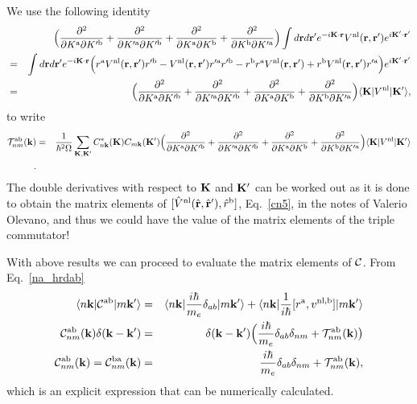 \documentclass[floatfix,prb,aps,superscriptaddress,11pt,preprint]{revtex4}
\begin{document}
We use the following identity
\begin{eqnarray}\label{3.4}
&&
\Big(
\frac{\partial^2}{\partial K^{\mathrm{a}}\partial K'^{\mathrm{b}}}
+
\frac{\partial^2}{\partial K'^{\mathrm{a}}\partial K'^{\mathrm{b}}}
+
\frac{\partial^2}{\partial K^{\mathrm{a}}\partial K^{\mathrm{b}}}
+
\frac{\partial^2}{\partial K^{\mathrm{b}}\partial K'^{\mathrm{a}}}
\Big)
\int
d\mathbf{r} d\mathbf{r}'
 e^{-i\mathbf{K}\cdot\mathbf{r}}
V^{\mathrm{nl}}(\mathbf{r},\mathbf{r}')
e^{i\mathbf{K}'\cdot\mathbf{r}'}
\nonumber\\
&=&
\int d\mathbf{r} d\mathbf{r}'
 e^{-i\mathbf{K}\cdot\mathbf{r}}
\Big( 
r^{\mathrm{a}} 
V^{\mathrm{nl}}(\mathbf{r},\mathbf{r}') 
r'^{\mathrm{b}}
- 
V^{\mathrm{nl}}(\mathbf{r},\mathbf{r}') 
r'^{\mathrm{a}} 
r'^{\mathrm{b}}
- 
r^{\mathrm{b}} 
r^{\mathrm{a}} 
V^{\mathrm{nl}}(\mathbf{r},\mathbf{r}')
+
 r^{\mathrm{b}} 
V^{\mathrm{nl}}(\mathbf{r},\mathbf{r}') 
r'^{\mathrm{a}}
\Big)  
e^{i\mathbf{K}'\cdot\mathbf{r}'}
\nonumber\\
&=&
\Big(
\frac{\partial^2}{\partial K^{\mathrm{a}}\partial K'^{\mathrm{b}}}
+
\frac{\partial^2}{\partial K'^{\mathrm{a}}\partial K'^{\mathrm{b}}}
+
\frac{\partial^2}{\partial K^{\mathrm{a}}\partial K^{\mathrm{b}}}
+
\frac{\partial^2}{\partial K^{\mathrm{b}}\partial K'^{\mathrm{a}}}
\Big)
\langle \mathbf{K} | 
V^{\mathrm{nl}}
| \mathbf{K}' \rangle 
,
\end{eqnarray}
to write
\begin{eqnarray}\label{3.7}
{\cal T}^{\mathrm{a}\mathrm{b}}_{nm}(\mathbf{k})
&=&
\frac{1}{\hbar^2\Omega}
\sum_{\mathbf{K},\mathbf{K}'} 
C^*_{n\mathbf{k}}(\mathbf{K}) 
C_{m\mathbf{k}}(\mathbf{K}')
\Big(
\frac{\partial^2}{\partial K^{\mathrm{a}}\partial K'^{\mathrm{b}}}
+
\frac{\partial^2}{\partial K'^{\mathrm{a}}\partial K'^{\mathrm{b}}}
+
\frac{\partial^2}{\partial K^{\mathrm{a}}\partial K^{\mathrm{b}}}
+
\frac{\partial^2}{\partial K^{\mathrm{b}}\partial K'^{\mathrm{a}}}
\Big)
\langle \mathbf{K} | 
V^{\mathrm{nl}}
| \mathbf{K}' \rangle 
\nonumber\\
.
\end{eqnarray} 
The double derivatives with respect to $\mathbf{K}$ and $\mathbf{K}'$ can be worked out as
it is done to obtain the matrix elements of
$[\hat V^{\mathrm{nl}}(\hat{\mathbf{r}},\hat{\mathbf{r}}'),\hat r^{\mathrm{b}}]$, 
Eq.~\eqref{cn5}, 
in the notes of Valerio Olevano,\cite{cual}
and thus we
could have the value of the matrix elements of the triple commutator!

With above results we can proceed to evaluate the matrix elements of ${\mathbf{\cal C}}$.
From Eq.~\eqref{na_hrdab}
\begin{eqnarray}\label{na_hrdabn}
\langle n\mathbf{k} |
{\mathbf{\cal C}}^{\mathrm{a}\mathrm{b}}
| m\mathbf{k}' \rangle
&=&
\langle n\mathbf{k} |
\frac{i\hbar}{m_e}\delta_{ab}
| m\mathbf{k}' \rangle
+
\langle n\mathbf{k} |
\frac{1}{i\hbar}[r^{\mathrm{a}},v^{\mathrm{nl},\mathrm{b}}]
| m\mathbf{k}' \rangle
\nonumber\\
{\mathbf{\cal C}}^{\mathrm{a}\mathrm{b}}_{nm}(\mathbf{k})
\delta(\mathbf{k}-\mathbf{k}')
&=&
\delta(\mathbf{k}-\mathbf{k}')
\Big(
\frac{i\hbar}{m_e}\delta_{ab}\delta_{nm}
+
{\cal T}_{nm}^{\mathrm{a}\mathrm{b}}(\mathbf{k})\big)
\nonumber\\
{\mathbf{\cal C}}^{\mathrm{a}\mathrm{b}}_{nm}(\mathbf{k})
={\mathbf{\cal C}}^{\mathrm{b}\mathrm{a}}_{nm}(\mathbf{k})
&=&
\frac{i\hbar}{m_e}\delta_{ab}\delta_{nm}
+
{\cal T}_{nm}^{\mathrm{a}\mathrm{b}}(\mathbf{k})
,
\end{eqnarray}
which is an explicit expression that can be numerically calculated.
\end{document}
